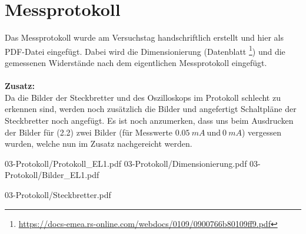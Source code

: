 

\def\skalierung{0.65}

\chapter{Messprotokoll}
\label{chap:protokoll}

Das Messprotokoll wurde am Versuchstag handschriftlich erstellt und hier als
PDF-Datei eingefügt. Dabei wird die Dimensionierung (Datenblatt \footnote{\url{https://docs-emea.rs-online.com/webdocs/0109/0900766b80109ff9.pdf}}) und die gemessenen Widerstände nach dem eigentlichen Messprotokoll eingefügt.\\\\
\textbf{Zusatz:}\\
Da die Bilder der Steckbretter und des Oszilloskops im Protokoll schlecht zu erkennen sind, werden noch zusätzlich die Bilder und angefertigt Schaltpläne der Steckbretter noch angefügt. Es ist noch anzumerken, dass uns beim Ausdrucken der Bilder für (2.2) zwei Bilder (für Messwerte $0.05~mA~\text{und}~0~mA$) vergessen wurden, welche nun im Zusatz nachgereicht werden.

%

{03-Protokoll/Protokoll_EL1.pdf}
           {03-Protokoll/Dimensionierung.pdf}
\label{sec:zusatz}
           {03-Protokoll/Bilder_EL1.pdf}

{03-Protokoll/Steckbretter.pdf}
